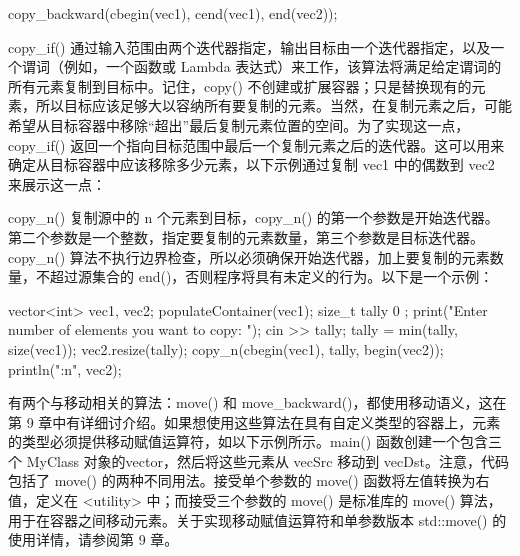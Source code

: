 \begin{cpp}
copy_backward(cbegin(vec1), cend(vec1), end(vec2));
\end{cpp}

copy\_if() 通过输入范围由两个迭代器指定，输出目标由一个迭代器指定，以及一个谓词（例如，一个函数或 Lambda 表达式）来工作，该算法将满足给定谓词的所有元素复制到目标中。记住，copy() 不创建或扩展容器；只是替换现有的元素，所以目标应该足够大以容纳所有要复制的元素。当然，在复制元素之后，可能希望从目标容器中移除“超出”最后复制元素位置的空间。为了实现这一点，copy\_if() 返回一个指向目标范围中最后一个复制元素之后的迭代器。这可以用来确定从目标容器中应该移除多少元素，以下示例通过复制 vec1 中的偶数到 vec2 来展示这一点：


copy\_n() 复制源中的 n 个元素到目标，copy\_n() 的第一个参数是开始迭代器。第二个参数是一个整数，指定要复制的元素数量，第三个参数是目标迭代器。copy\_n() 算法不执行边界检查，所以必须确保开始迭代器，加上要复制的元素数量，不超过源集合的 end()，否则程序将具有未定义的行为。以下是一个示例：

\begin{cpp}
vector<int> vec1, vec2;
populateContainer(vec1);
size_t tally { 0 };
print("Enter number of elements you want to copy: ");
cin >> tally;
tally = min(tally, size(vec1));
vec2.resize(tally);
copy_n(cbegin(vec1), tally, begin(vec2));
println("{:n}", vec2);
\end{cpp}


有两个与移动相关的算法：move() 和 move\_backward()，都使用移动语义，这在第 9 章中有详细讨介绍。如果想使用这些算法在具有自定义类型的容器上，元素的类型必须提供移动赋值运算符，如以下示例所示。main() 函数创建一个包含三个 MyClass 对象的vector，然后将这些元素从 vecSrc 移动到 vecDst。注意，代码包括了 move() 的两种不同用法。接受单个参数的 move() 函数将左值转换为右值，定义在 <utility> 中；而接受三个参数的 move() 是标准库的 move() 算法，用于在容器之间移动元素。关于实现移动赋值运算符和单参数版本 std::move() 的使用详情，请参阅第 9 章。

